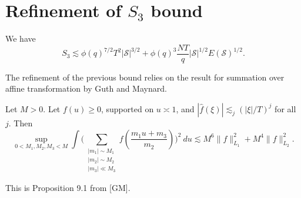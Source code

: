 \section{Refinement of $S_3$ bound}

\begin{proposition}[Refinement of $S_3$]
    \label{refinements_3}
    We have \[
    S_3\lesssim \phi(q)^{7/2}T^2|\mathcal{S}|^{3/2}+\phi(q)^{3}\frac{NT}{q}|\mathcal{S}|^{1/2}E(\mathcal{S})^{1/2}.
     \]
\end{proposition}
The refinement of the previous bound relies on the result for summation over affine transformation by Guth and Maynard.
\begin{lemma} \label{affineGM}
    Let $M>0$. Let $f(u)\geq 0$, supported on $u\asymp 1$, and $|\hat{f}(\xi)|\lesssim_j (|\xi|/T)^j$ for all $j$. Then \[
        \sup_{0<M_1,M_2,M_3<M} \int\Bigg( \sum_{\substack{|m_1|\sim M_1\\|m_2|\sim M_2 \\ |m_3|\ll M_3}} f\left(\frac{m_1 u+m_3}{m_2}\right)\Bigg)^2 \ du \lesssim M^6 \|f\|_{L_1}^2+M^4\|f\|_{L_2}^2.
    \] 
\end{lemma}
This is Proposition 9.1 from [GM].
